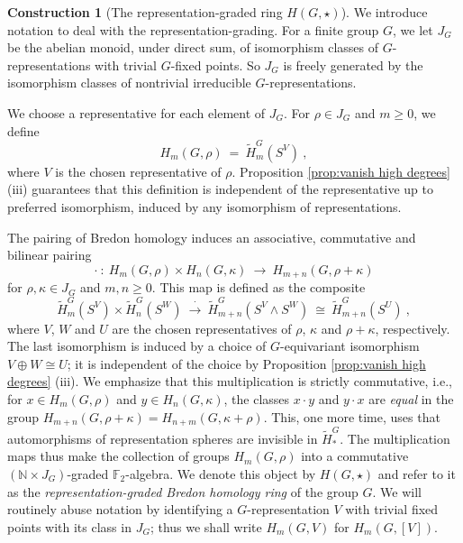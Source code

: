 \documentclass{amsart}[12pt]
\newcommand{\mF}{{\mathbb F}}
\newcommand{\mN}{{\mathbb N}}
\newcommand{\iso}{\cong}
\newcommand{\sm}{\wedge}
\newcommand{\xra}{\xrightarrow}
\renewcommand{\to}{\longrightarrow}
\numberwithin{equation}{section}
\theoremstyle{definition}
\newtheorem{construction}[equation]{Construction}
\begin{document}
\begin{construction}[The representation-graded ring $H(G,\star)$]
  We introduce notation to deal with the representation-grading.
  For a finite group $G$, we let $J_G$ be the abelian monoid, under direct sum,
  of isomorphism classes of $G$-representations with trivial $G$-fixed points.
  So $J_G$ is freely generated by the
  isomorphism classes of nontrivial irreducible $G$-representations.
  
  We choose a representative for each element of $J_G$. For $\rho\in J_G$ and $m\geq 0$,
  we define
  \[ H_m(G,\rho)\ = \ \tilde H_m^G(S^V)\ , \]
  where $V$ is the chosen representative of $\rho$.
  Proposition \ref{prop:vanish high degrees} (iii) guarantees that this definition
  is independent of the representative up to preferred isomorphism,
  induced by any isomorphism of representations.
  
  The pairing of Bredon homology induces an associative, commutative and bilinear pairing
  \[ \cdot \ : \ H_m(G,\rho)\times H_n(G,\kappa)\ \to \ H_{m+n}(G,\rho+\kappa) \]
  for $\rho,\kappa\in J_G$ and $m,n\geq 0$.
  This map is defined as the composite
  \[ \tilde H_m^G(S^V)\times \tilde H_n^G(S^W)\  \xra{\ \cdot\ }\
    \tilde H_{m+n}^G(S^V\sm S^W)\ \iso \  \tilde H_{m+n}^G(S^U)\ , \]
  where $V$, $W$ and $U$ are the chosen representatives of $\rho$, $\kappa$
  and $\rho+\kappa$, respectively.
  The last isomorphism is induced by a choice of $G$-equivariant isomorphism
  $V\oplus W\iso U$; it is independent of the choice
  by Proposition \ref{prop:vanish high degrees} (iii).
  We emphasize that this multiplication is strictly commutative, i.e., for
  $x\in H_m(G,\rho)$ and $y\in H_n(G,\kappa)$, the classes
  $x\cdot y$ and $y\cdot x$ are {\em equal} in the group
  $H_{m+n}(G,\rho+\kappa)=H_{n+m}(G,\kappa+\rho)$.
  This, one more time, uses that automorphisms of representation spheres
  are invisible in $\tilde H^G_*$.
  The multiplication maps thus make the collection of groups $H_m(G,\rho)$
  into a commutative $(\mN\times J_G)$-graded $\mF_2$-algebra.
  We denote this object by $H(G,\star)$ and refer to it as the
  {\em representation-graded Bredon homology ring} of the group $G$.
  We will routinely abuse notation by identifying a $G$-representation $V$ with
  trivial fixed points with its class in $J_G$; thus we shall write
  $H_m(G,V)$ for $H_m(G,[V])$.
\end{construction}
\end{document}
